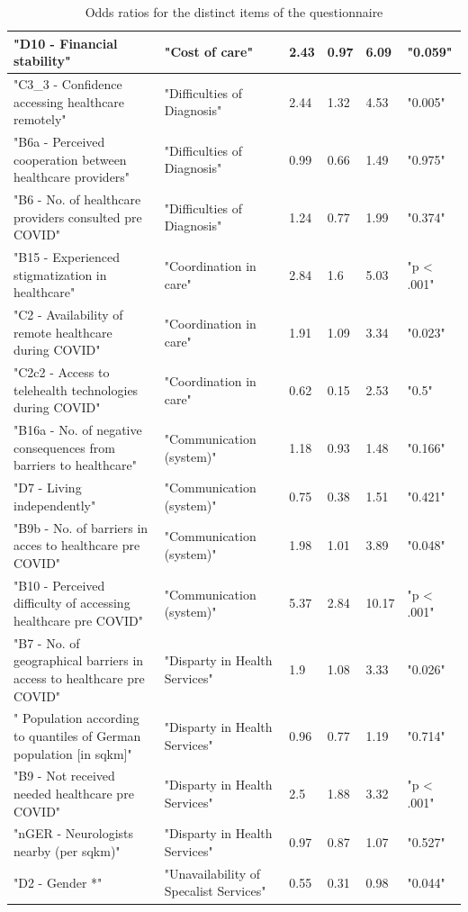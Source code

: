 \documentclass{bmcart}
\begin{document}
\begin{backmatter}
\begin{table}[!ht]
\begin{tabular}{|l|l|l|l|l|l|}
        "D10 - Financial stability" & "Cost of care" & 2.43 & 0.97 & 6.09 & "0.059" \\ \hline
        "C3\_3 - Confidence accessing healthcare remotely" & "Difficulties of Diagnosis" & 2.44 & 1.32 & 4.53 & "0.005" \\ \hline
        "B6a - Perceived cooperation between healthcare providers" & "Difficulties of Diagnosis" & 0.99 & 0.66 & 1.49 & "0.975" \\ \hline
        "B6 - No. of healthcare providers consulted pre COVID" & "Difficulties of Diagnosis" & 1.24 & 0.77 & 1.99 & "0.374" \\ \hline
        "B15 - Experienced stigmatization in healthcare" & "Coordination in care" & 2.84 & 1.6 & 5.03 & "p < .001" \\ \hline
        "C2 - Availability of remote healthcare during COVID" & "Coordination in care" & 1.91 & 1.09 & 3.34 & "0.023" \\ \hline
        "C2c2 - Access to telehealth technologies during COVID" & "Coordination in care" & 0.62 & 0.15 & 2.53 & "0.5" \\ \hline
        "B16a - No. of negative consequences from barriers to healthcare" & "Communication (system)" & 1.18 & 0.93 & 1.48 & "0.166" \\ \hline
        "D7 - Living independently" & "Communication (system)" & 0.75 & 0.38 & 1.51 & "0.421" \\ \hline
        "B9b - No. of barriers in acces to healthcare pre COVID" & "Communication (system)" & 1.98 & 1.01 & 3.89 & "0.048" \\ \hline
        "B10 - Perceived difficulty of accessing healthcare pre COVID" & "Communication (system)" & 5.37 & 2.84 & 10.17 & "p < .001" \\ \hline
        "B7 - No. of geographical barriers in access to healthcare pre COVID" & "Disparty in Health Services" & 1.9 & 1.08 & 3.33 & "0.026" \\ \hline
        "  Population according to quantiles of German population [in sqkm]" & "Disparty in Health Services" & 0.96 & 0.77 & 1.19 & "0.714" \\ \hline
        "B9 - Not received needed healthcare pre COVID" & "Disparty in Health Services" & 2.5 & 1.88 & 3.32 & "p < .001" \\ \hline
        "nGER - Neurologists nearby (per sqkm)" & "Disparty in Health Services" & 0.97 & 0.87 & 1.07 & "0.527" \\ \hline
        "D2 - Gender *" & "Unavailability of Specalist Services" & 0.55 & 0.31 & 0.98 & "0.044" \\ \hline
    \end{tabular}
\caption{Odds ratios for the distinct items of the questionnaire}


\end{table}
\end{backmatter}
\end{document}
